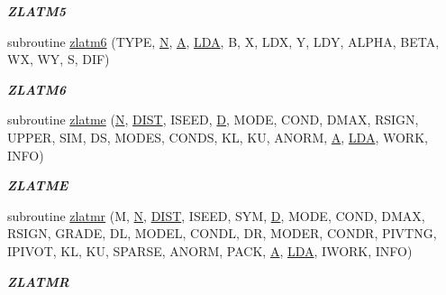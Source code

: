 \begin{DoxyCompactItemize}
\begin{DoxyCompactList}\small\item\em {\bfseries Z\+L\+A\+T\+M5} \end{DoxyCompactList}\item 
subroutine \hyperlink{group__complex16__matgen_gab090f307aa94b87f91bf1bc0b3475353}{zlatm6} (T\+Y\+P\+E, \hyperlink{polmisc_8c_a0240ac851181b84ac374872dc5434ee4}{N}, \hyperlink{classA}{A}, \hyperlink{example__user_8c_ae946da542ce0db94dced19b2ecefd1aa}{L\+D\+A}, B, X, L\+D\+X, Y, L\+D\+Y, A\+L\+P\+H\+A, B\+E\+T\+A, W\+X, W\+Y, S, D\+I\+F)
\begin{DoxyCompactList}\small\item\em {\bfseries Z\+L\+A\+T\+M6} \end{DoxyCompactList}\item 
subroutine \hyperlink{group__complex16__matgen_gae773f8419cc26a6c84f41d7c3bbe2eb2}{zlatme} (\hyperlink{polmisc_8c_a0240ac851181b84ac374872dc5434ee4}{N}, \hyperlink{superlu__enum__consts_8h_af00a42ecad444bbda75cde1b64bd7e72ac04fbbdf0d80a4ad25e565541deeebd7}{D\+I\+S\+T}, I\+S\+E\+E\+D, \hyperlink{odrpack_8h_a7dae6ea403d00f3687f24a874e67d139}{D}, M\+O\+D\+E, C\+O\+N\+D, D\+M\+A\+X, R\+S\+I\+G\+N, U\+P\+P\+E\+R, S\+I\+M, D\+S, M\+O\+D\+E\+S, C\+O\+N\+D\+S, K\+L, K\+U, A\+N\+O\+R\+M, \hyperlink{classA}{A}, \hyperlink{example__user_8c_ae946da542ce0db94dced19b2ecefd1aa}{L\+D\+A}, W\+O\+R\+K, I\+N\+F\+O)
\begin{DoxyCompactList}\small\item\em {\bfseries Z\+L\+A\+T\+M\+E} \end{DoxyCompactList}\item 
subroutine \hyperlink{group__complex16__matgen_gaa5a10e6e0222dec668950eb66ab46465}{zlatmr} (M, \hyperlink{polmisc_8c_a0240ac851181b84ac374872dc5434ee4}{N}, \hyperlink{superlu__enum__consts_8h_af00a42ecad444bbda75cde1b64bd7e72ac04fbbdf0d80a4ad25e565541deeebd7}{D\+I\+S\+T}, I\+S\+E\+E\+D, S\+Y\+M, \hyperlink{odrpack_8h_a7dae6ea403d00f3687f24a874e67d139}{D}, M\+O\+D\+E, C\+O\+N\+D, D\+M\+A\+X, R\+S\+I\+G\+N, G\+R\+A\+D\+E, D\+L, M\+O\+D\+E\+L, C\+O\+N\+D\+L, D\+R, M\+O\+D\+E\+R, C\+O\+N\+D\+R, P\+I\+V\+T\+N\+G, I\+P\+I\+V\+O\+T, K\+L, K\+U, S\+P\+A\+R\+S\+E, A\+N\+O\+R\+M, P\+A\+C\+K, \hyperlink{classA}{A}, \hyperlink{example__user_8c_ae946da542ce0db94dced19b2ecefd1aa}{L\+D\+A}, I\+W\+O\+R\+K, I\+N\+F\+O)
\begin{DoxyCompactList}\small\item\em {\bfseries Z\+L\+A\+T\+M\+R} \end{DoxyCompactList}\item 

\end{DoxyCompactItemize}
